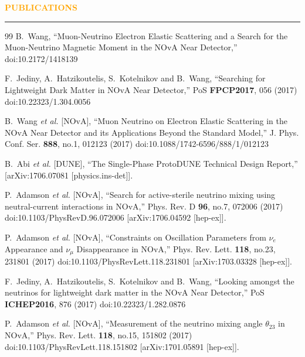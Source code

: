 \documentclass{resume} %
\renewenvironment{rSection}[1]{
\sectionskip
\textcolor{Orange}{\bfseries\MakeUppercase{#1}}
\sectionlineskip
\hrule
\begin{list}{}{
\setlength{\leftmargin}{1.5em}
}
\item[]
}{
\end{list}
}
\begin{document}
\begin{rSection}{ Publications}
\begin{thebibliography}{99}
B.~Wang,
``Muon-Neutrino Electron Elastic Scattering and a Search for the Muon-Neutrino Magnetic Moment in the NOvA Near Detector,''
doi:10.2172/1418139

F.~Jediny, A.~Hatzikoutelis, S.~Kotelnikov and B.~Wang,
``Searching for Lightweight Dark Matter in NOvA Near Detector,''
PoS \textbf{FPCP2017}, 056 (2017)
doi:10.22323/1.304.0056

B.~Wang \textit{et al.} [NOvA],
``Muon Neutrino on Electron Elastic Scattering in the NOvA Near Detector and its Applications Beyond the Standard Model,''
J. Phys. Conf. Ser. \textbf{888}, no.1, 012123 (2017)
doi:10.1088/1742-6596/888/1/012123

B.~Abi \textit{et al.} [DUNE],
``The Single-Phase ProtoDUNE Technical Design Report,''
[arXiv:1706.07081 [physics.ins-det]].

P.~Adamson \textit{et al.} [NOvA],
``Search for active-sterile neutrino mixing using neutral-current interactions in NOvA,''
Phys. Rev. D \textbf{96}, no.7, 072006 (2017)
doi:10.1103/PhysRevD.96.072006
[arXiv:1706.04592 [hep-ex]].

P.~Adamson \textit{et al.} [NOvA],
``Constraints on Oscillation Parameters from $\nu_e$ Appearance and $\nu_\mu$ Disappearance in NOvA,''
Phys. Rev. Lett. \textbf{118}, no.23, 231801 (2017)
doi:10.1103/PhysRevLett.118.231801
[arXiv:1703.03328 [hep-ex]].

F.~Jediny, A.~Hatzikoutelis, S.~Kotelnikov and B.~Wang,
``Looking amongst the neutrinos for lightweight dark matter in the NOvA Near Detector,''
PoS \textbf{ICHEP2016}, 876 (2017)
doi:10.22323/1.282.0876

P.~Adamson \textit{et al.} [NOvA],
``Measurement of the neutrino mixing angle $\theta_{23}$ in NOvA,''
Phys. Rev. Lett. \textbf{118}, no.15, 151802 (2017)
doi:10.1103/PhysRevLett.118.151802
[arXiv:1701.05891 [hep-ex]].


\end{thebibliography}
\end{rSection}
\end{document}
